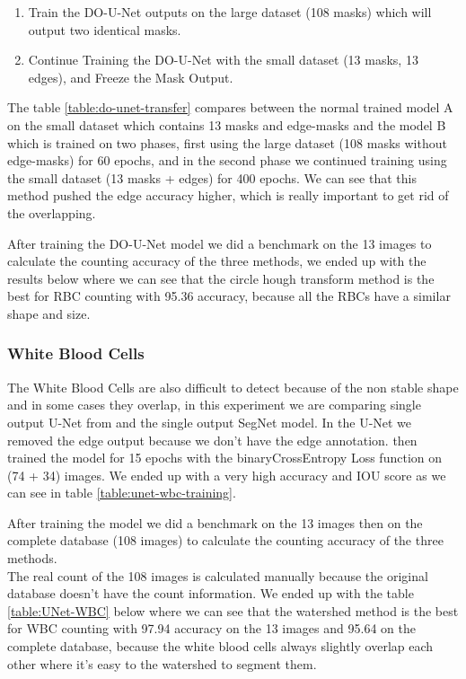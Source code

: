 \documentclass[conference]{IEEEtran}
\begin{document}
\begin{enumerate}
    \item Train the DO-U-Net outputs on the large dataset (108 masks) which will output two identical masks.
    \item Continue Training the DO-U-Net with the small dataset (13 masks, 13 edges), and Freeze the Mask Output.
\end{enumerate}

The table \ref{table:do-unet-transfer} compares between the normal trained model A on the small dataset which contains 13 masks and edge-masks and the model B which is trained on two phases, first using the large dataset (108 masks without edge-masks) for 60 epochs, and in the second phase we continued training using the small dataset (13 masks + edges) for 400 epochs.
We can see that this method pushed the edge accuracy higher, which is really important to get rid of the overlapping.



After training the DO-U-Net model we did a benchmark on the 13 images to calculate the counting accuracy of the three methods, we ended up with the results below where we can see that the circle hough transform method is the best for RBC counting with 95.36 accuracy, because all the RBCs have a similar shape and size.

\subsubsection{White Blood Cells}
\hspace{\parindent}
The White Blood Cells are also difficult to detect because of the non stable shape and in some cases they overlap, in this experiment we are comparing single output U-Net from \cite{10.1007/978-3-030-44584-3_31} and the single output SegNet model.
In the U-Net we removed the edge output because we don't have the edge annotation. then trained the model for 15 epochs with the binaryCrossEntropy Loss function on (74 + 34) images. 
We ended up with a very high accuracy and IOU score as we can see in table \ref{table:unet-wbc-training}.

After training the model we did a benchmark on the 13 images then on the complete database (108 images) to calculate the counting accuracy of the three methods.\\ 
The real count of the 108 images is calculated manually because the original database doesn't have the count information. We ended up with the table \ref{table:UNet-WBC} below where we can see that the watershed method is the best for WBC counting with 97.94 accuracy on the 13 images and 95.64 on the complete database, because the white blood cells always slightly overlap each other where it's easy to the watershed to segment them.
\end{document}
